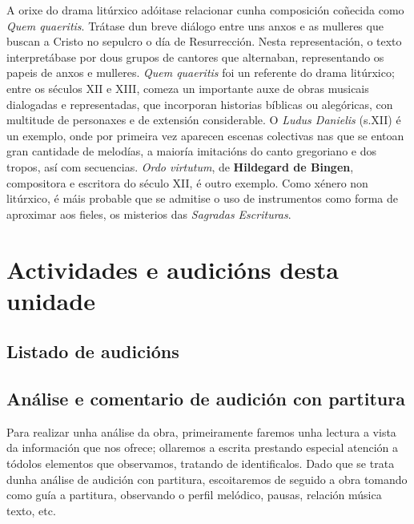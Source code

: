 \documentclass[spanish, a4paper,nobind]{templates/ociamthesis}
\begin{document}
A orixe do drama litúrxico adóitase relacionar cunha composición coñecida como \emph{Quem quaeritis}. Trátase dun breve diálogo entre uns anxos e as mulleres que buscan a Cristo no sepulcro o día de Resurrección. Nesta representación, o texto interpretábase por dous grupos de cantores que alternaban, representando os papeis de anxos e mulleres. \emph{Quem quaeritis} foi un referente do drama litúrxico; entre os séculos XII e XIII, comeza un importante auxe de obras musicais dialogadas e representadas, que incorporan historias bíblicas ou alegóricas, con multitude de personaxes e de extensión considerable. O \emph{Ludus Danielis} (s.XII) é un exemplo, onde por primeira vez aparecen escenas colectivas nas que se entoan gran cantidade de melodías, a maioría imitacións do canto gregoriano e dos tropos, así com secuencias. \emph{Ordo virtutum}, de \textbf{Hildegard de Bingen}, compositora e escritora do século XII, é outro exemplo. Como xénero non litúrxico, é máis probable que se admitise o uso de instrumentos como forma de aproximar aos fieles, os misterios das \emph{Sagradas Escrituras}.

\newpage

\hypertarget{actividades-e-audiciuxf3ns-desta-unidade}{%
\section*{Actividades e audicións desta unidade}\label{actividades-e-audiciuxf3ns-desta-unidade}}

\hypertarget{listado-de-audiciuxf3ns}{%
\subsection*{Listado de audicións}\label{listado-de-audiciuxf3ns}}

\hypertarget{anuxe1lise-e-comentario-de-audiciuxf3n-con-partitura}{%
\subsection*{Análise e comentario de audición con partitura}\label{anuxe1lise-e-comentario-de-audiciuxf3n-con-partitura}}

Para realizar unha análise da obra, primeiramente faremos unha lectura a vista da información que nos ofrece; ollaremos a escrita prestando especial atención a tódolos elementos que observamos, tratando de identificalos. Dado que se trata dunha análise de audición con partitura, escoitaremos de seguido a obra tomando como guía a partitura, observando o perfil melódico, pausas, relación música texto, etc.
\end{document}
